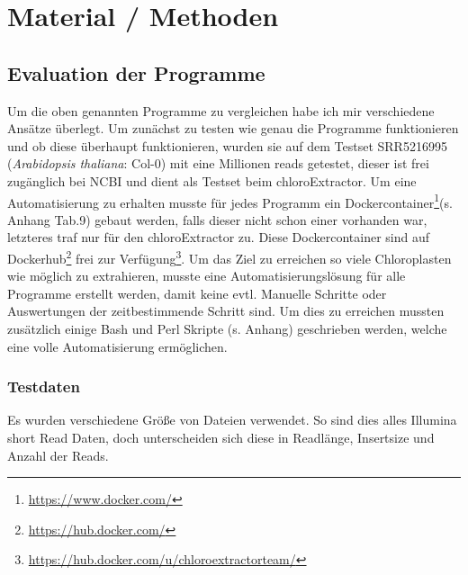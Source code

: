 \documentclass{scrartcl}
\begin{document}
\section{Material / Methoden}
\label{sec-3}
\subsection{Evaluation der Programme}
\label{sec-3-1}
Um die oben genannten Programme zu vergleichen habe ich mir verschiedene Ansätze überlegt.
Um zunächst zu testen wie genau die Programme funktionieren und ob diese überhaupt funktionieren,
wurden sie auf dem Testset SRR5216995 (\emph{Arabidopsis thaliana}: Col-0) mit eine Millionen reads getestet, 
dieser ist frei zugänglich bei NCBI und dient als Testset beim chloroExtractor\footnotemark[15]{}. Um eine 
Automatisierung zu erhalten musste für jedes Programm ein Dockercontainer\footnote{\url{https://www.docker.com/}}(s. Anhang Tab.9) gebaut werden, falls dieser nicht 
schon einer vorhanden war, letzteres traf nur für den chloroExtractor zu. Diese Dockercontainer sind auf Dockerhub\footnote{\url{https://hub.docker.com/}} frei
zur Verfügung\footnote{\url{https://hub.docker.com/u/chloroextractorteam/}}. Um das Ziel zu erreichen
so viele Chloroplasten wie möglich zu extrahieren, musste eine Automatisierungslösung für alle Programme
erstellt werden, damit keine evtl. Manuelle Schritte oder Auswertungen der zeitbestimmende Schritt sind.
Um dies zu erreichen mussten zusätzlich einige Bash und Perl Skripte (s. Anhang) geschrieben werden, welche eine volle
Automatisierung ermöglichen.   

\subsubsection{Testdaten}
\label{sec-3-1-1}
Es wurden verschiedene Größe von Dateien verwendet. So sind dies alles Illumina short Read Daten, doch unterscheiden sich diese in Readlänge, Insertsize und Anzahl der Reads.
\end{document}
